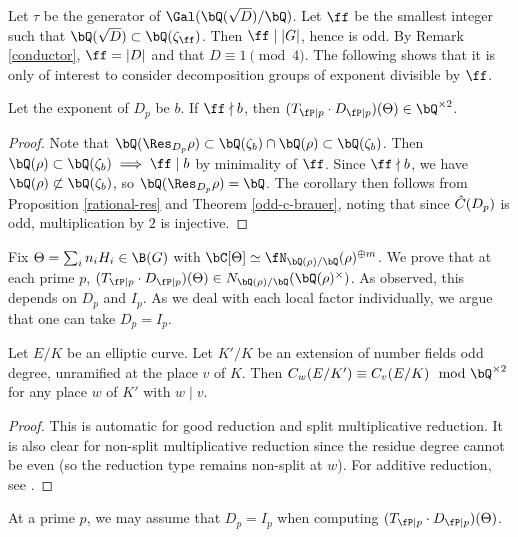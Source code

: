 Let $\tau$ be the generator of $\Gal(\bQ(\sqrt{D}) / \bQ)$.
Let $\ff$ be the smallest integer such that $\bQ(\sqrt{D}) \subset \bQ(\zeta_{\ff})$. Then $\ff \mid |G|$, hence is odd. By Remark \ref{conductor}, $\ff = |D|$ and that $D \equiv 1 \pmod 4$. The following shows that it is only of interest to consider decomposition groups of exponent divisible by $\ff$.

\begin{cor}\label{rational-res-2}
    Let the exponent of $D_p$ be $b$. If $\ff \nmid b$, then $(T_{\fP \mid p} \cdot D_{\fP \mid p})(\Theta) \in \bQ^{\times 2}$.
\end{cor}

\begin{proof}
    Note that $\bQ(\Res_{D_p}{\rho}) \subset \bQ(\zeta_b) \cap \bQ(\rho) \subset \bQ(\zeta_b)$. Then $\bQ(\rho) \subset \bQ(\zeta_b) \implies \ff \mid b$ by minimality of $\ff$. Since $\ff \nmid b$, we have $\bQ(\rho) \not\subset \bQ(\zeta_b)$, so $\bQ(\Res_{D_p} \rho) = \bQ$. The corollary then follows from Proposition \ref{rational-res} and Theorem \ref{odd-c-brauer}, noting that since $\hat{C}(D_p)$ is odd, multiplication by $2$ is injective. 
\end{proof}

Fix $\Theta = \sum_i n_i H_i \in \B(G)$ with $\bC[\Theta] \simeq \repnorm{\rho}^{\oplus m}$. We prove that at each prime $p$, $(T_{\fP \mid p}\cdot D_{\fP \mid p})(\Theta) \in \fieldnorm{\rho}$.  As observed, this depends on $D_p$ and $I_p$. As we deal with each local factor individually, we argue that one can take $D_p = I_p$.

\begin{lemma}\label{tam-up-to-square}
    Let $E / K$ be an elliptic curve. Let $K' / K$ be an extension of number fields odd degree, unramified at the place $v$ of $K$. Then $C_w(E / K') \equiv C_v(E / K) \mod \bQ^{\times 2}$ for any place $w$ of $K'$ with $ w \mid v$. 
\end{lemma}

\begin{proof}
This is automatic for good reduction and split multiplicative reduction. It is also clear for non-split multiplicative reduction since the residue degree cannot be even (so the reduction type remains non-split at $w$). For additive reduction, see \cite[Lemma 3.12]{reg-const}.
\end{proof}

\begin{lemma}\label{DeqI}
    At a prime $p$, we may assume that $D_p = I_p$ when computing $(T_{\fP \mid p} \cdot D_{\fP \mid p})(\Theta)$. 
\end{lemma}

